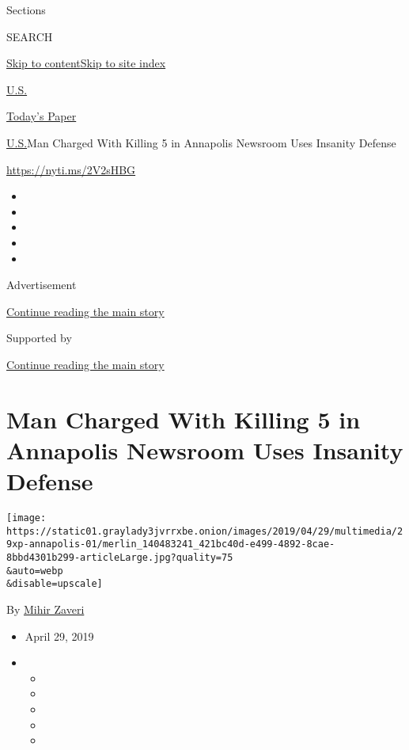Sections

SEARCH

\protect\hyperlink{site-content}{Skip to
content}\protect\hyperlink{site-index}{Skip to site index}

\href{https://www.nytimes3xbfgragh.onion/section/us}{U.S.}

\href{https://myaccount.nytimes3xbfgragh.onion/auth/login?response_type=cookie\&client_id=vi}{}

\href{https://www.nytimes3xbfgragh.onion/section/todayspaper}{Today's
Paper}

\href{/section/us}{U.S.}\textbar{}Man Charged With Killing 5 in
Annapolis Newsroom Uses Insanity Defense

\url{https://nyti.ms/2V2sHBG}

\begin{itemize}
\item
\item
\item
\item
\item
\end{itemize}

Advertisement

\protect\hyperlink{after-top}{Continue reading the main story}

Supported by

\protect\hyperlink{after-sponsor}{Continue reading the main story}

\hypertarget{man-charged-with-killing-5-in-annapolis-newsroom-uses-insanity-defense}{%
\section{Man Charged With Killing 5 in Annapolis Newsroom Uses Insanity
Defense}\label{man-charged-with-killing-5-in-annapolis-newsroom-uses-insanity-defense}}

\texttt{[image: https://static01.graylady3jvrrxbe.onion/images/2019/04/29/multimedia/29xp-annapolis-01/merlin\_140483241\_421bc40d-e499-4892-8cae-8bbd4301b299-articleLarge.jpg?quality=75\\\&auto=webp\\\&disable=upscale]}

By \href{https://www.nytimes3xbfgragh.onion/by/mihir-zaveri}{Mihir
Zaveri}

\begin{itemize}
\item
  April 29, 2019
\item
  \begin{itemize}
  \item
  \item
  \item
  \item
  \item
  \end{itemize}
\end{itemize}


